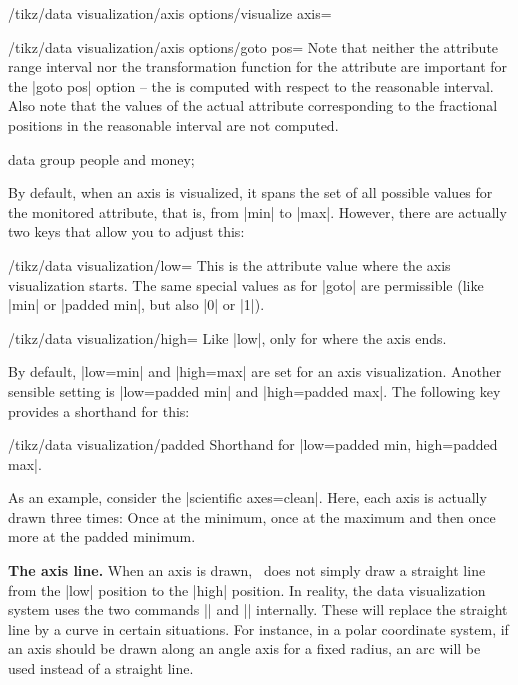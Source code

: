 \begin{key}{/tikz/data visualization/axis options/visualize axis=}
\begin{key}{/tikz/data visualization/axis options/goto pos=}
        Note that neither the attribute range interval nor the transformation
        function for the attribute are important for the |goto pos| option --
        the  is computed with respect to the reasonable
        interval. Also note that the values of the actual attribute
        corresponding to the fractional positions in the reasonable interval
        are not computed.
\begin{codeexample}[]
\tikz \datavisualization [
    our system,
    x axis={attribute=time, length=4cm},
    left axis ={attribute=money},
    right axis={attribute=people},
    visualize as line/.list={people 1, people 2, money 1, money 2}]
  data group {people and money};
\end{codeexample}
    \end{key}

    By default, when an axis is visualized, it spans the set of all possible
    values for the monitored attribute, that is, from |min| to |max|. However,
    there are actually two keys that allow you to adjust this:
    \begin{key}{/tikz/data visualization/low=}
        This is the attribute value where the axis visualization starts. The
        same special values as for |goto| are permissible (like |min| or
        |padded min|, but also |0| or |1|).
    \end{key}
    \begin{key}{/tikz/data visualization/high=}
        Like |low|, only for where the axis ends.
    \end{key}

    By default, |low=min| and |high=max| are set for an axis visualization.
    Another sensible setting is |low=padded min| and |high=padded max|. The
    following key provides a shorthand for this:
    \begin{key}{/tikz/data visualization/padded}
        Shorthand for |low=padded min, high=padded max|.
    \end{key}
    As an example, consider the |scientific axes=clean|. Here, each axis is
    actually drawn three times: Once at the minimum, once at the maximum and
    then once more at the padded minimum.


    \medskip
    \textbf{The axis line.}
    When an axis is drawn, \tikzname\ does not simply draw a straight line from
    the |low| position to the |high| position. In reality, the data
    visualization system uses the two commands |\pgfpathdvmoveto| and
    |\pgfpathdvlineto| internally. These will replace the straight line by a
    curve in certain situations. For instance, in a polar coordinate system, if
    an axis should be drawn along an angle axis for a fixed radius, an arc will
    be used instead of a straight line.



\end{key}
